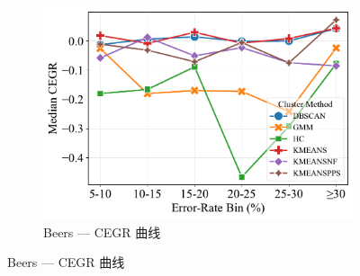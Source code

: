 \documentclass[10pt]{article} %
\numberwithin{equation}{section}
\begin{document}
\begin{enumerate}[label=(\alph*)]
\begin{figure}[H]
\begin{subfigure}[b]{0.33\linewidth}
    \includegraphics[width=\linewidth]{figures/6.4.3graph/CEGR_5pct_beers.pdf}
    \caption{Beers — CEGR 曲线}
    \label{fig:be_cegr}
  \end{subfigure}


\end{figure}
\end{enumerate}
\end{document}
